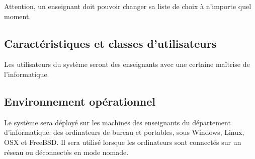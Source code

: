 Attention, un enseignant doit pouvoir changer sa liste de choix à n’importe quel moment.

	
	\subsection{Caractéristiques et classes d'utilisateurs}

Les utilisateurs du système seront des enseignants avec une certaine maîtrise de l'informatique.

	\subsection{Environnement opérationnel}

Le système sera déployé sur les machines des enseignants du département d'informatique: des ordinateurs de bureau et portables, sous Windows, Linux, OSX et FreeBSD.
Il sera utilisé lorsque les ordinateurs sont connectés sur un réseau ou déconnectés en mode nomade. 


